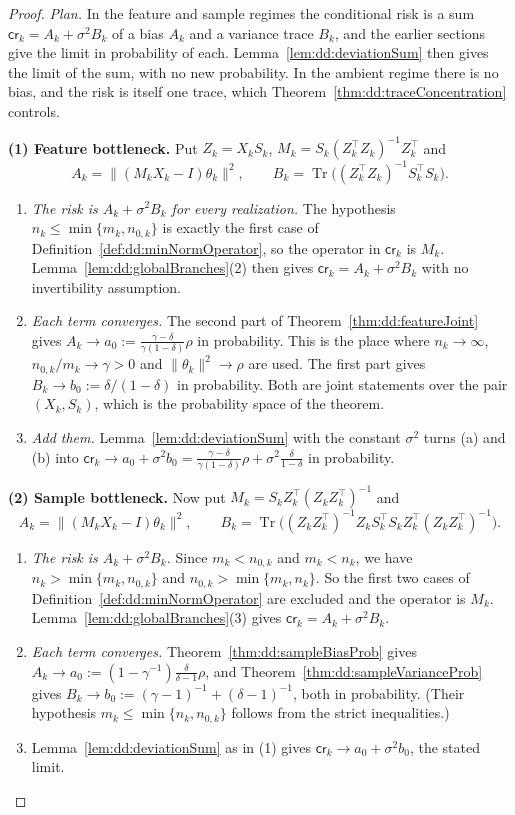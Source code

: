 \begin{proof}
  \leanok
\emph{Plan.} In the feature and sample regimes the conditional risk is a sum $\mathsf{cr}_k=A_k+\sigma^2B_k$ of a bias $A_k$ and a variance trace $B_k$, and the earlier sections give the limit in probability of each. Lemma~\ref{lem:dd:deviationSum} then gives the limit of the sum, with no new probability.
In the ambient regime there is no bias, and the risk is itself one trace, which Theorem~\ref{thm:dd:traceConcentration} controls.

\medskip\noindent\textbf{(1) Feature bottleneck.} Put $Z_k=X_kS_k$, $M_k=S_k(Z_k^\top Z_k)^{-1}Z_k^\top$ and
\[
  A_k=\|(M_kX_k-I)\theta_k\|^2,\qquad B_k=\operatorname{Tr}\bigl((Z_k^\top Z_k)^{-1}S_k^\top S_k\bigr).
\]
\begin{enumerate}
  \item[(a)] \emph{The risk is $A_k+\sigma^2B_k$ for every realization.} The hypothesis $n_k\le\min\{m_k,n_{0,k}\}$ is exactly the first case of Definition~\ref{def:dd:minNormOperator}, so the operator in $\mathsf{cr}_k$ is $M_k$. Lemma~\ref{lem:dd:globalBranches}(2) then gives $\mathsf{cr}_k=A_k+\sigma^2B_k$ with no invertibility assumption.
  \item[(b)] \emph{Each term converges.} The second part of Theorem~\ref{thm:dd:featureJoint} gives $A_k\to a_0:=\frac{\gamma-\delta}{\gamma(1-\delta)}\rho$ in probability. This is the place where $n_k\to\infty$, $n_{0,k}/m_k\to\gamma>0$ and $\|\theta_k\|^2\to\rho$ are used. The first part gives $B_k\to b_0:=\delta/(1-\delta)$ in probability. Both are joint statements over the pair $(X_k,S_k)$, which is the probability space of the theorem.
  \item[(c)] \emph{Add them.} Lemma~\ref{lem:dd:deviationSum} with the constant $\sigma^2$ turns (a) and (b) into
  $\mathsf{cr}_k\to a_0+\sigma^2b_0=\frac{\gamma-\delta}{\gamma(1-\delta)}\rho+\sigma^2\frac{\delta}{1-\delta}$ in probability.
\end{enumerate}

\medskip\noindent\textbf{(2) Sample bottleneck.} Now put $M_k=S_kZ_k^\top(Z_kZ_k^\top)^{-1}$ and
\[
  A_k=\|(M_kX_k-I)\theta_k\|^2,\qquad B_k=\operatorname{Tr}\bigl((Z_kZ_k^\top)^{-1}Z_kS_k^\top S_kZ_k^\top(Z_kZ_k^\top)^{-1}\bigr).
\]
\begin{enumerate}
  \item[(a)] \emph{The risk is $A_k+\sigma^2B_k$.} Since $m_k<n_{0,k}$ and $m_k<n_k$, we have $n_k>\min\{m_k,n_{0,k}\}$ and $n_{0,k}>\min\{m_k,n_k\}$. So the first two cases of Definition~\ref{def:dd:minNormOperator} are excluded and the operator is $M_k$. Lemma~\ref{lem:dd:globalBranches}(3) gives $\mathsf{cr}_k=A_k+\sigma^2B_k$.
  \item[(b)] \emph{Each term converges.} Theorem~\ref{thm:dd:sampleBiasProb} gives $A_k\to a_0:=(1-\gamma^{-1})\frac{\delta}{\delta-1}\rho$, and Theorem~\ref{thm:dd:sampleVarianceProb} gives $B_k\to b_0:=(\gamma-1)^{-1}+(\delta-1)^{-1}$, both in probability. (Their hypothesis $m_k\le\min\{n_k,n_{0,k}\}$ follows from the strict inequalities.)
  \item[(c)] Lemma~\ref{lem:dd:deviationSum} as in (1) gives $\mathsf{cr}_k\to a_0+\sigma^2b_0$, the stated limit.
\end{enumerate}


\end{proof}
